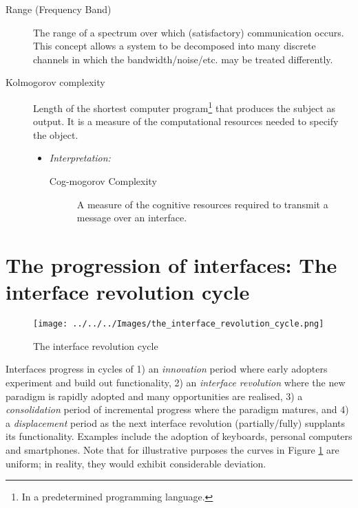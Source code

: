 \documentclass[logo,bsc,singlespacing,parskip]{infthesis}
\begin{document}
{\begin{mdframed}
\begin{description}
\item[{Range\label{range} (\label{org04e38cf}Frequency Band)}] The range of a spectrum over which (satisfactory) communication occurs. This concept allows a system to be decomposed into many discrete channels in which the bandwidth/noise/etc. may be treated differently.
\end{description}
\end{mdframed}

\begin{mdframed}
\begin{description}
\item[{Kolmogorov complexity}] Length of the shortest computer program\footnote{In a predetermined programming language.} that produces the subject as output. It is a measure of the computational resources needed to specify the object.
\begin{itemize}
\item \emph{Interpretation:}
\begin{description}
\item[{Cog-mogorov Complexity}] A measure of the cognitive resources required to transmit a message over an interface.
\end{description}
\end{itemize}
\end{description}
\end{mdframed}
}

\section{The progression of interfaces: The interface revolution cycle}
\label{sec:orgd66842e}
\begin{figure}[h]
\centering
\texttt{[image: ../../../Images/the\_interface\_revolution\_cycle.png]}
\caption{\label{fig:interface_rev_cycle}The interface revolution cycle}
\end{figure}

Interfaces progress in cycles of 1) an \emph{innovation} period where early adopters experiment and build out functionality, 2) an \emph{interface revolution} where the new paradigm is rapidly adopted and many opportunities are realised, 3) a \emph{consolidation} period of incremental progress where the paradigm matures, and 4) a \emph{displacement} period as the next interface revolution (partially/fully) supplants its functionality.
Examples include the adoption of keyboards, personal computers and smartphones.
Note that for illustrative purposes the curves in Figure \ref{fig:interface_rev_cycle} are uniform; in reality, they would exhibit considerable deviation.
\end{document}
